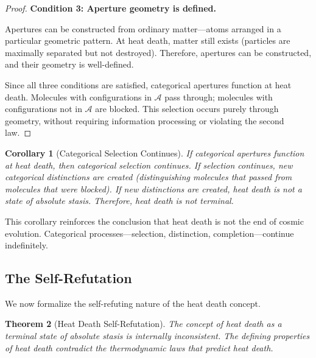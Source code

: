 \documentclass[12pt,a4paper]{article}
\newtheorem{theorem}{Theorem}[section]
\newtheorem{corollary}[theorem]{Corollary}
\theoremstyle{definition}
\theoremstyle{remark}
\begin{document}
\begin{proof}
\textbf{Condition 3: Aperture geometry is defined.}

Apertures can be constructed from ordinary matter—atoms arranged in a particular geometric pattern. At heat death, matter still exists (particles are maximally separated but not destroyed). Therefore, apertures can be constructed, and their geometry is well-defined.

Since all three conditions are satisfied, categorical apertures function at heat death. Molecules with configurations in $\mathcal{A}$ pass through; molecules with configurations not in $\mathcal{A}$ are blocked. This selection occurs purely through geometry, without requiring information processing or violating the second law.
\end{proof}

\begin{corollary}[Categorical Selection Continues]
\label{cor:selection_continues}
If categorical apertures function at heat death, then categorical selection continues. If selection continues, new categorical distinctions are created (distinguishing molecules that passed from molecules that were blocked). If new distinctions are created, heat death is not a state of absolute stasis. Therefore, heat death is not terminal.
\end{corollary}

This corollary reinforces the conclusion that heat death is not the end of cosmic evolution. Categorical processes—selection, distinction, completion—continue indefinitely.

\subsection{The Self-Refutation}

We now formalize the self-refuting nature of the heat death concept.

\begin{theorem}[Heat Death Self-Refutation]
\label{thm:self_refutation}
The concept of heat death as a terminal state of absolute stasis is internally inconsistent. The defining properties of heat death contradict the thermodynamic laws that predict heat death.
\end{theorem}
\end{document}
